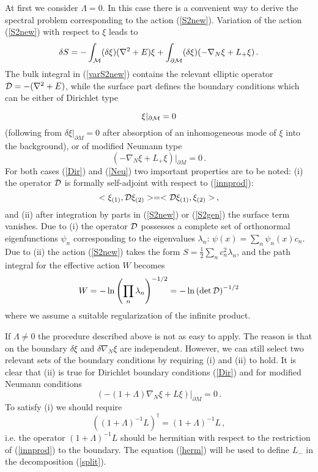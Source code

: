 \documentclass[a4paper,12pt]{article}
\newcommand{\oB}{|_{\partial{\cal M}}}
\begin{document}
At first we consider  $\Lambda =0$. In this case there is a convenient way to
derive the spectral problem corresponding to the action
(\ref{S2new}). Variation of the action (\ref{S2new}) with
respect to $\xi$ leads to 
\begin{equation}
\delta S=- \int_{\cal M}  (\delta\xi )(\nabla^2 +E)\xi
+\int_{\partial {\cal M}} (\delta\xi )
(-\nabla_N \xi +L_+\xi ) \,.\label{varS2new}
\end{equation}
The bulk integral in (\ref{varS2new}) contains the relevant
elliptic operator ${\cal D}=-(\nabla^2 +E)$, while the surface
part defines the boundary conditions which can be either
of Dirichlet type

\begin{equation}
\xi \oB =0 \label{Dir}
\end{equation}
(following from $\delta\xi \vert_{\partial M}  =0$ after absorption
of an inhomogeneous mode of $\xi$ into the background),
or of modified Neumann type
\begin{equation}
(-\nabla_N \xi +L_+\xi ) \vert_{\partial M} =0 \label{Neu} \,.
\end{equation}
For both cases (\ref{Dir}) and (\ref{Neu})
two  important properties are to be noted:  (i) the operator
${\cal D}$ is formally self-adjoint with respect to (\ref{innprod}):
\begin{equation}
<\xi_{(1)},{\cal D}\xi_{(2)}>=<{\cal D}\xi_{(1)}, \xi_{(2)}>\, ,
\label{self}
\end{equation}
and (ii) after integration by parts in (\ref{S2new}) 
or (\ref{S2gen}) the surface
term vanishes. Due to (i) the operator ${\cal D}$ possesses a complete set of
orthonormal eigenfunctions $\psi_n$ corresponding to the eigenvalues
$\lambda_n$: $\psi (x) =\sum_n \psi_n(x)c_n$. 
Due to (ii) the action (\ref{S2new}) takes the form
$S=\frac 12 \sum_n c_n^2 \lambda_n$, and the path integral 
for the effective action $W$ becomes 
\begin{equation}
W=-\ln \left( \prod_n \lambda_n \right)^{-1/2}=
-\ln \left( \det {\cal D} \right)^{-1/2} \label{pathint}
\end{equation}  
where we assume a suitable regularization of the infinite
product. 

If $\Lambda \ne 0$ the procedure described above is not as 
easy to apply. The reason is that on the boundary
$\delta\xi$ and $\delta\nabla_N\xi$ are independent.
However, we can still select 
two relevant sets of the boundary conditions by requiring 
(i) and (ii) to hold.
It is clear that (ii) is true for Dirichlet boundary
conditions (\ref{Dir}) and for modified Neumann
conditions
\begin{equation}
(-(1+\Lambda )\nabla_N\xi +L\xi )\vert_{\partial M} =0 \,.\label{Neu2}
\end{equation}
To satisfy (i) we should require
\begin{equation}
((1+\Lambda )^{-1}L)^\dag =(1+\Lambda )^{-1}L\,, \label{herm}
\end{equation}
i.e. the operator $(1+\Lambda )^{-1}L$ should be hermitian
with respect to the restriction of (\ref{innprod})
to the boundary. The equation (\ref{herm}) will be used
to define $L_-$ in the decomposition
(\ref{split}).
\end{document}
